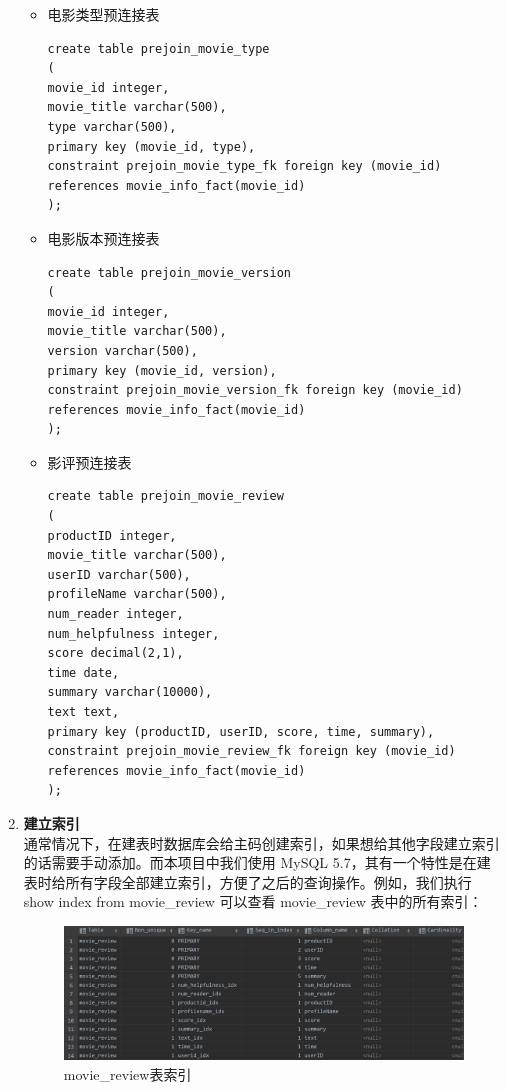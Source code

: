 \documentclass{ctexrep}
\begin{document}
\begin{enumerate}
\begin{itemize}
            \item 电影类型预连接表
                \begin{lstlisting}
create table prejoin_movie_type
(
movie_id integer,
movie_title varchar(500),
type varchar(500),
primary key (movie_id, type),
constraint prejoin_movie_type_fk foreign key (movie_id) references movie_info_fact(movie_id)
);
                \end{lstlisting}
            \item 电影版本预连接表
                \begin{lstlisting}
create table prejoin_movie_version
(
movie_id integer,
movie_title varchar(500),
version varchar(500),
primary key (movie_id, version),
constraint prejoin_movie_version_fk foreign key (movie_id) references movie_info_fact(movie_id)
);
                \end{lstlisting}
            \item 影评预连接表
                \begin{lstlisting}
create table prejoin_movie_review
(
productID integer,
movie_title varchar(500),
userID varchar(500),
profileName varchar(500),
num_reader integer,
num_helpfulness integer,
score decimal(2,1),
time date,
summary varchar(10000),
text text,
primary key (productID, userID, score, time, summary),
constraint prejoin_movie_review_fk foreign key (movie_id) references movie_info_fact(movie_id)
);
                \end{lstlisting}
        \end{itemize}
        \item \textbf{建立索引}\\
        通常情况下，在建表时数据库会给主码创建索引，如果想给其他字段建立索引的话需要手动添加。而本项目中我们使用 MySQL 5.7，其有一个特性是在建表时给所有字段全部建立索引，方便了之后的查询操作。例如，我们执行 show index from movie\_review 可以查看 movie\_review 表中的所有索引：
        \begin{figure}[H]
    		\centering
    		\includegraphics[width=0.7\linewidth]{img/index.png}
    		\caption{movie\_review表索引}
    		\label{fig:MySQL_DB2}
    	\end{figure}
    \end{enumerate}
\end{document}
